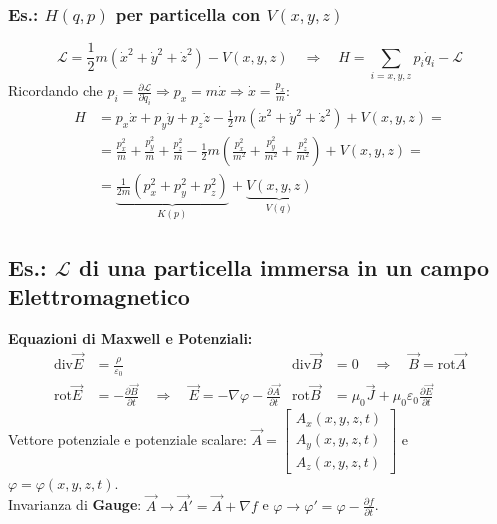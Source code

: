 \documentclass[11pt, a4paper]{article}
\begin{document}
\subsubsection{Es.: $H(q,p)$ per particella con $V(x,y,z)$}
\begin{equation*}
    \mathcal{L} = \frac{1}{2}m(\dot{x}^2 + \dot{y}^2 + \dot{z}^2) - V(x,y,z) \quad \Rightarrow \quad H = \sum_{i=x,y,z} p_i \dot{q}_i - \mathcal{L}
\end{equation*}
Ricordando che $p_i = \frac{\partial \mathcal{L}}{\partial \dot{q}_i} \Rightarrow p_x = m\dot{x} \Rightarrow \dot{x} = \frac{p_x}{m}$:
\begin{align*}
    H &= p_x \dot{x} + p_y \dot{y} + p_z \dot{z} - \frac{1}{2}m(\dot{x}^2 + \dot{y}^2 + \dot{z}^2) + V(x,y,z) = \\
      &= \frac{p_x^2}{m} + \frac{p_y^2}{m} + \frac{p_z^2}{m} - \frac{1}{2}m\left(\frac{p_x^2}{m^2} + \frac{p_y^2}{m^2} + \frac{p_z^2}{m^2}\right) + V(x,y,z) = \\
      &= \underbrace{\frac{1}{2m}(p_x^2 + p_y^2 + p_z^2)}_{K(p)} + \underbrace{V(x,y,z)}_{V(q)}
\end{align*}

\subsection{Es.: $\mathcal{L}$ di una particella immersa in un campo Elettromagnetico}

\textbf{Equazioni di Maxwell e Potenziali:}
\begin{align*}
    \text{div} \vec{E} &= \frac{\rho}{\varepsilon_0} & \text{div} \vec{B} &= 0 \quad \Rightarrow \quad \vec{B} = \text{rot} \vec{A} \\
    \text{rot} \vec{E} &= -\frac{\partial \vec{B}}{\partial t} \quad \Rightarrow \quad \vec{E} = -\nabla \varphi - \frac{\partial \vec{A}}{\partial t} & \text{rot} \vec{B} &= \mu_0 \vec{J} + \mu_0\varepsilon_0 \frac{\partial \vec{E}}{\partial t}
\end{align*}
Vettore potenziale e potenziale scalare: $\vec{A} = \begin{bmatrix} A_x(x,y,z,t) \\ A_y(x,y,z,t) \\ A_z(x,y,z,t) \end{bmatrix}$ e $\varphi = \varphi(x,y,z,t)$. \\
Invarianza di \textbf{Gauge}: $\vec{A} \rightarrow \vec{A}' = \vec{A} + \nabla f$ e $\varphi \rightarrow \varphi' = \varphi - \frac{\partial f}{\partial t}$.\\
\end{document}
